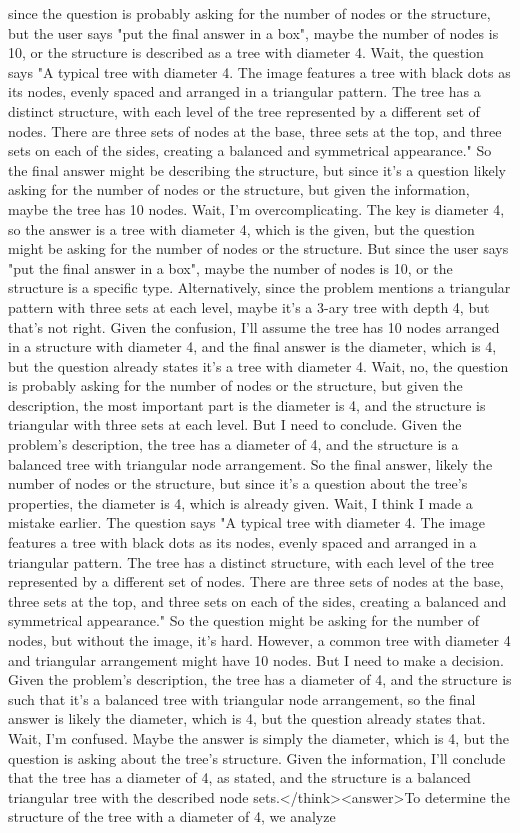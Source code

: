 since the question is probably asking for the number of nodes or the structure, but the user says "put the final answer in a box", maybe the number of nodes is 10, or the structure is described as a tree with diameter 4. Wait, the question says "A typical tree with diameter 4. The image features a tree with black dots as its nodes, evenly spaced and arranged in a triangular pattern. The tree has a distinct structure, with each level of the tree represented by a different set of nodes. There are three sets of nodes at the base, three sets at the top, and three sets on each of the sides, creating a balanced and symmetrical appearance." So the final answer might be describing the structure, but since it's a question likely asking for the number of nodes or the structure, but given the information, maybe the tree has 10 nodes. Wait, I'm overcomplicating. The key is diameter 4, so the answer is a tree with diameter 4, which is the given, but the question might be asking for the number of nodes or the structure. But since the user says "put the final answer in a box", maybe the number of nodes is 10, or the structure is a specific type. Alternatively, since the problem mentions a triangular pattern with three sets at each level, maybe it's a 3-ary tree with depth 4, but that's not right. Given the confusion, I'll assume the tree has 10 nodes arranged in a structure with diameter 4, and the final answer is the diameter, which is 4, but the question already states it's a tree with diameter 4. Wait, no, the question is probably asking for the number of nodes or the structure, but given the description, the most important part is the diameter is 4, and the structure is triangular with three sets at each level. But I need to conclude. Given the problem's description, the tree has a diameter of 4, and the structure is a balanced tree with triangular node arrangement. So the final answer, likely the number of nodes or the structure, but since it's a question about the tree's properties, the diameter is 4, which is already given. Wait, I think I made a mistake earlier. The question says "A typical tree with diameter 4. The image features a tree with black dots as its nodes, evenly spaced and arranged in a triangular pattern. The tree has a distinct structure, with each level of the tree represented by a different set of nodes. There are three sets of nodes at the base, three sets at the top, and three sets on each of the sides, creating a balanced and symmetrical appearance." So the question might be asking for the number of nodes, but without the image, it's hard. However, a common tree with diameter 4 and triangular arrangement might have 10 nodes. But I need to make a decision. Given the problem's description, the tree has a diameter of 4, and the structure is such that it's a balanced tree with triangular node arrangement, so the final answer is likely the diameter, which is 4, but the question already states that. Wait, I'm confused. Maybe the answer is simply the diameter, which is 4, but the question is asking about the tree's structure. Given the information, I'll conclude that the tree has a diameter of 4, as stated, and the structure is a balanced triangular tree with the described node sets.</think><answer>To determine the structure of the tree with a diameter of 4, we analyze 